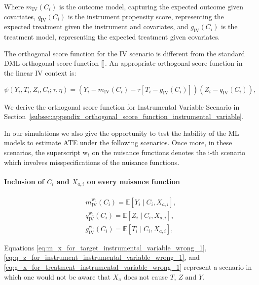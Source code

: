 \documentclass{article}
\numberwithin{equation}{section}
\begin{document}
Where $m_{\text{IV}}(C_i)$ is the outcome model, capturing the expected outcome given covariates, $q_{\text{IV}}(C_i)$ is the instrument propensity score, representing the expected treatment given the instrument and covariates, and $g_{\text{IV}}(C_i)$ is the treatment model, representing the expected treatment given covariates.

The orthogonal score function for the IV scenario is different from the standard DML orthogonal score function [\cite{BelloniChernozhukovHansen2014, ChernozhukovChetverikovDemireretal2018}]. An appropriate orthogonal score function in the linear IV context is:

\begin{equation}
    \psi(Y_i, T_i, Z_i, C_i; \tau, \eta) = \left( Y_i - m_{\text{IV}}(C_i) - \tau [T_i - g_{\text{IV}}(C_i)] \right) \left( Z_i - q_{\text{IV}}(C_i) \right),
    \label{eq:orthogonal_score_iv}
\end{equation}

We derive the orthogonal score function for Instrumental Variable Scenario in Section~\ref{subsec:appendix_orthogonal_score_function_instrumental_variable}.

In our simulations we also give the opportunity to test the hability of the ML models to estimate ATE under the following scenarios. Once more, in these scenarios, the superscript $\text{w}_i$ on the nuisance functions denotes the i-th scenario which involves misspecifications of the nuisance functions.

\paragraph{Inclusion of $C_i$ and $X_{a, i}$ on every nuisance function}

\begin{align}
    & m_{\text{IV}}^{\text{w}_1}(C_i) = \mathbb{E}[Y_i \mid C_i, X_{a, i}],
    \label{eq:m_x_for_target_instrumental_variable_wrong_1} \\
    & q_{\text{IV}}^{\text{w}_1}(C_i) = \mathbb{E}[Z_i \mid C_i, X_{a, i}],
    \label{eq:q_z_for_instrument_instrumental_variable_wrong_1} \\
    & g_{\text{IV}}^{\text{w}_1}(C_i) = \mathbb{E}[T_i \mid C_i, X_{a, i}],
    \label{eq:g_x_for_treatment_instrumental_variable_wrong_1}
\end{align}

Equations \eqref{eq:m_x_for_target_instrumental_variable_wrong_1}, \eqref{eq:q_z_for_instrument_instrumental_variable_wrong_1}, and \eqref{eq:g_x_for_treatment_instrumental_variable_wrong_1} represent a scenario in which one would not be aware that $X_a$ does not cause $T$, $Z$ and $Y$.
\end{document}
